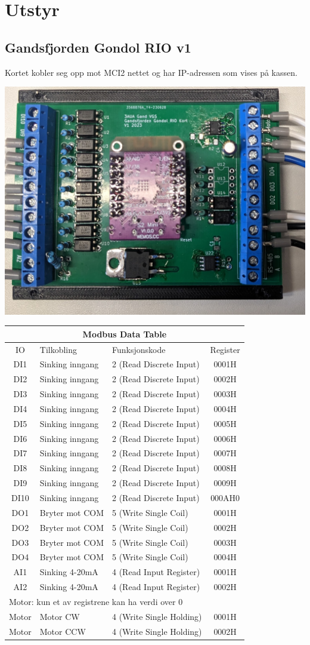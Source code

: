 
\section{Utstyr}
\subsection{Gandsfjorden Gondol RIO v1}

Kortet kobler seg opp mot MCI2 nettet og har IP-adressen som vises på kassen. 

\includegraphics[width=1\textwidth]{./GandsfjordenGondolRIO.jpg}
\small
\begin{tabular}{|c|l|l|c|}
\hline 
\multicolumn{4}{|c|}{Modbus Data Table}\tabularnewline
\hline 
\hline 
	IO & Tilkobling & Funksjonskode & Register \tabularnewline
\hline 
	DI1 & Sinking inngang & 2 (Read Discrete Input) & 0001H \tabularnewline
\hline 
	DI2 & Sinking inngang & 2 (Read Discrete Input) & 0002H \tabularnewline
\hline 
	DI3 & Sinking inngang & 2 (Read Discrete Input) & 0003H \tabularnewline
\hline 
	DI4 & Sinking inngang & 2 (Read Discrete Input) & 0004H \tabularnewline
\hline 
	DI5 & Sinking inngang & 2 (Read Discrete Input) & 0005H \tabularnewline
\hline 
	DI6 & Sinking inngang & 2 (Read Discrete Input) & 0006H \tabularnewline
\hline 
	DI7 & Sinking inngang & 2 (Read Discrete Input) & 0007H \tabularnewline
\hline 
	DI8 & Sinking inngang & 2 (Read Discrete Input) & 0008H \tabularnewline
\hline 
	DI9 & Sinking inngang & 2 (Read Discrete Input) & 0009H \tabularnewline
\hline 
	DI10 & Sinking inngang & 2 (Read Discrete Input) & 000AH0\tabularnewline
\hline 
	DO1 & Bryter mot COM & 5 (Write Single Coil) & 0001H \tabularnewline
\hline 
	DO2 & Bryter mot COM & 5 (Write Single Coil) & 0002H \tabularnewline
\hline 
	DO3 & Bryter mot COM & 5 (Write Single Coil) & 0003H \tabularnewline
\hline 
	DO4 & Bryter mot COM & 5 (Write Single Coil) & 0004H \tabularnewline
\hline 
	AI1 & Sinking 4-20mA & 4 (Read Input Register) & 0001H \tabularnewline
\hline 
	AI2 & Sinking 4-20mA & 4 (Read Input Register) & 0002H \tabularnewline
\hline 
\multicolumn{4}{|l|}{Motor: kun et av registrene kan ha verdi over 0}\tabularnewline
\hline 
	Motor &  Motor CW & 4 (Write Single Holding) & 0001H \tabularnewline
\hline 
	Motor &  Motor CCW & 4 (Write Single Holding) & 0002H \tabularnewline
\hline 
\end{tabular}
\normalsize
\vfil \eject
